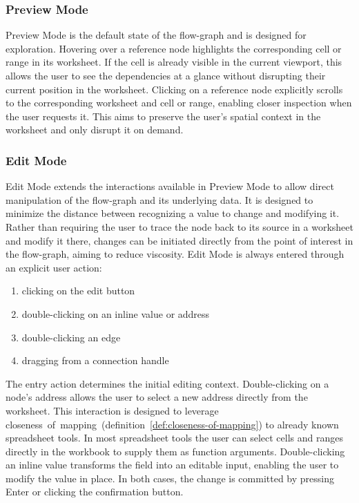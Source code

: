 \subsubsection{Preview Mode}
Preview Mode is the default state of the flow-graph and is designed for exploration. Hovering over a reference node highlights the corresponding cell or range in its worksheet. If the cell is already visible in the current viewport, this allows the user to see the dependencies at a glance without disrupting their current position in the worksheet. Clicking on a reference node explicitly scrolls to the corresponding worksheet and cell or range, enabling closer inspection when the user requests it. This aims to preserve the user's spatial context in the worksheet and only disrupt it on demand. 

\subsubsection{Edit Mode}
Edit Mode extends the interactions available in Preview Mode to allow direct manipulation of the flow-graph and its underlying data. It is designed to minimize the distance between recognizing a value to change and modifying it. Rather than requiring the user to trace the node back to its source in a worksheet and modify it there, changes can be initiated directly from the point of interest in the flow-graph, aiming to reduce viscosity.
Edit Mode is always entered through an explicit user action:
\begin{samepage}
    \begin{enumerate}
    \item clicking on the edit button
    \item double-clicking on an inline value or address
    \item double-clicking an edge
    \item dragging from a connection handle
\end{enumerate}
\end{samepage}
The entry action determines the initial editing context. Double-clicking on a node's address allows the user to select a new address directly from the worksheet. This interaction is designed to leverage closeness~of~mapping~(definition~\ref{def:closeness-of-mapping}) to already known spreadsheet tools. In most spreadsheet tools the user can select cells and ranges directly in the workbook to supply them as function arguments. Double-clicking an inline value transforms the field into an editable input, enabling the user to modify the value in place. In both cases, the change is committed by pressing Enter or clicking the confirmation button.
